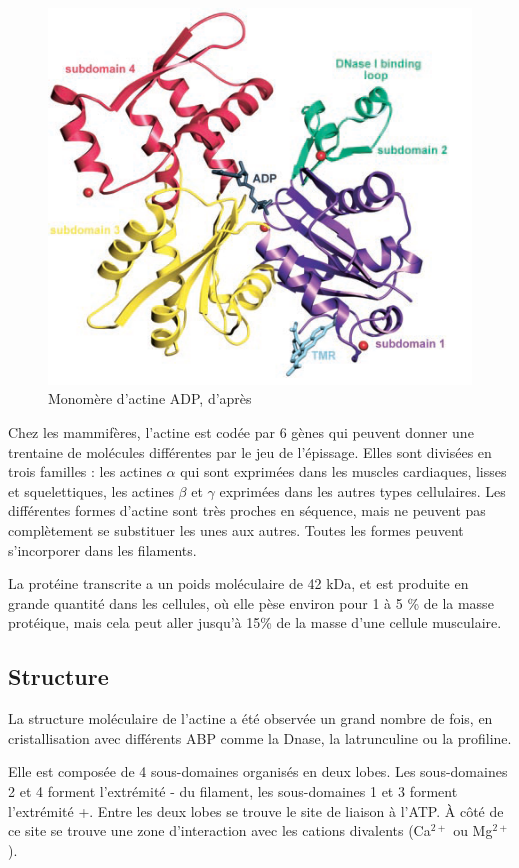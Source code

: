 \begin{figure}
\includegraphics[scale=0.7]{Actine_dominguez.png}
\caption{Monomère d'actine ADP, d'après \cite{otterbein_crystal_2001}}
\end{figure}

Chez les mammifères, l'actine est codée par 6 gènes qui peuvent donner une trentaine de molécules différentes par le jeu de l'épissage. 
Elles sont divisées en trois familles : les actines $\alpha$ qui sont exprimées dans les muscles cardiaques, lisses et squelettiques, les actines $\beta$ et $\gamma$ exprimées dans les autres types cellulaires.
Les différentes formes d'actine sont très proches en séquence, mais ne peuvent pas complètement se substituer les unes aux autres. Toutes les formes peuvent s'incorporer dans les filaments. 

La protéine transcrite a un poids moléculaire de 42 kDa, et est produite en grande quantité dans les cellules, où elle pèse environ pour 1 à 5 \% de la masse protéique, mais cela peut aller jusqu'à 15\% de la masse d'une cellule musculaire. 

\subsection{Structure}
La structure moléculaire de l'actine a été observée un grand nombre de fois, en cristallisation avec différents ABP comme la Dnase, la latrunculine ou la profiline. 

Elle est composée de 4 sous-domaines organisés en deux lobes. Les sous-domaines 2 et 4 forment l'extrémité - du filament, les sous-domaines 1 et 3 forment l'extrémité +. Entre les deux lobes se trouve le site de liaison à l'ATP. 
À côté de ce site se trouve une zone d'interaction avec les cations divalents (Ca$^{2+}$ ou Mg$^{2+}$). 

